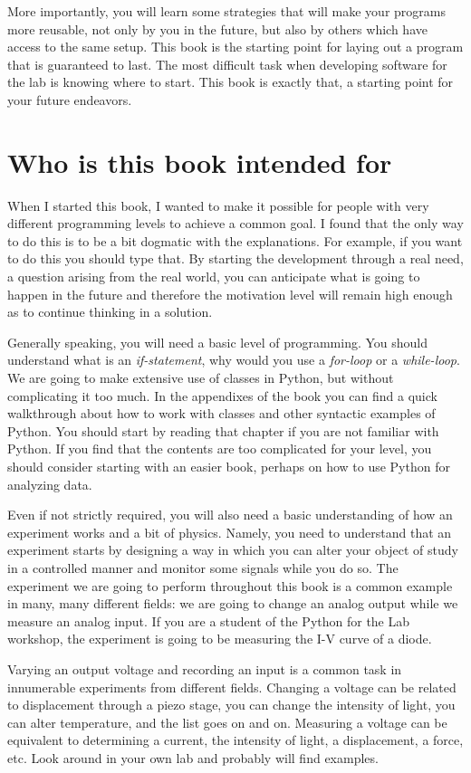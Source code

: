 More importantly, you will learn some strategies that will make your programs more reusable, not only by you in the future, but also by others which have access to the same setup. This book is the starting point for laying out a program that is guaranteed to last. The most difficult task when developing software for the lab is knowing where to start. This book is exactly that, a starting point for your future endeavors.

\section{Who is this book intended for}
When I started this book, I wanted to make it possible for people with very different programming levels to achieve a common goal. I found that the only way to do this is to be a bit dogmatic with the explanations. For example, if you want to do this you should type that. By starting the development through a real need, a question arising from the real world, you can anticipate what is going to happen in the future and therefore the motivation level will remain high enough as to continue thinking in a solution.

Generally speaking, you will need a basic level of programming. You should understand what is an \textit{if-statement}, why would you use a \textit{for-loop} or a \textit{while-loop}. We are going to make extensive use of classes in Python, but without complicating it too much. In the appendixes of the book you can find a quick walkthrough about how to work with classes and other syntactic examples of Python. You should start by reading that chapter if you are not familiar with Python. If you find that the contents are too complicated for your level, you should consider starting with an easier book, perhaps on how to use Python for analyzing data.

Even if not strictly required, you will also need a basic understanding of how an experiment works and a bit of physics. Namely, you need to understand that an experiment starts by designing a way in which you can alter your object of study in a controlled manner and monitor some signals while you do so. The experiment we are going to perform throughout this book is a common example in many, many different fields: we are going to change an analog output while we measure an analog input. If you are a student of the Python for the Lab workshop, the experiment is going to be measuring the I-V curve of a diode.

Varying an output voltage and recording an input is a common task in innumerable experiments from different fields. Changing a voltage can be related to displacement through a piezo stage, you can change the intensity of light, you can alter temperature, and the list goes on and on. Measuring a voltage can be equivalent to determining a current, the intensity of light, a displacement, a force, etc. Look around in your own lab and probably will find examples.


